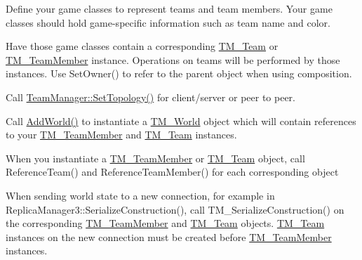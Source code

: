 \begin{DoxyEnumerate}
\item Define your game classes to represent teams and team members. Your game classes should hold game-\/specific information such as team name and color.\par

\item Have those game classes contain a corresponding \hyperlink{class_rak_net_1_1_t_m___team}{T\-M\-\_\-\-Team} or \hyperlink{class_rak_net_1_1_t_m___team_member}{T\-M\-\_\-\-Team\-Member} instance. Operations on teams will be performed by those instances. Use Set\-Owner() to refer to the parent object when using composition.\par

\item Call \hyperlink{class_rak_net_1_1_team_manager_a863260b06e910fc8b352e8c97b90d173}{Team\-Manager\-::\-Set\-Topology()} for client/server or peer to peer.\par

\item Call \hyperlink{class_rak_net_1_1_team_manager_a329c459c522b5e3204424499fe4f8bd7}{Add\-World()} to instantiate a \hyperlink{class_rak_net_1_1_t_m___world}{T\-M\-\_\-\-World} object which will contain references to your \hyperlink{class_rak_net_1_1_t_m___team_member}{T\-M\-\_\-\-Team\-Member} and \hyperlink{class_rak_net_1_1_t_m___team}{T\-M\-\_\-\-Team} instances.\par

\item When you instantiate a \hyperlink{class_rak_net_1_1_t_m___team_member}{T\-M\-\_\-\-Team\-Member} or \hyperlink{class_rak_net_1_1_t_m___team}{T\-M\-\_\-\-Team} object, call Reference\-Team() and Reference\-Team\-Member() for each corresponding object\par

\item When sending world state to a new connection, for example in Replica\-Manager3\-::\-Serialize\-Construction(), call T\-M\-\_\-\-Serialize\-Construction() on the corresponding \hyperlink{class_rak_net_1_1_t_m___team_member}{T\-M\-\_\-\-Team\-Member} and \hyperlink{class_rak_net_1_1_t_m___team}{T\-M\-\_\-\-Team} objects. \hyperlink{class_rak_net_1_1_t_m___team}{T\-M\-\_\-\-Team} instances on the new connection must be created before \hyperlink{class_rak_net_1_1_t_m___team_member}{T\-M\-\_\-\-Team\-Member} instances.\par


\end{DoxyEnumerate}
